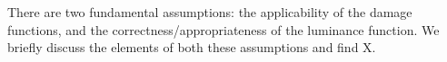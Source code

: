 \documentclass{article}
\begin{document}
There are two fundamental assumptions: the applicability of the damage functions, and the correctness/appropriateness of the luminance function. We briefly discuss the elements of both these assumptions and find X.








\end{document}
